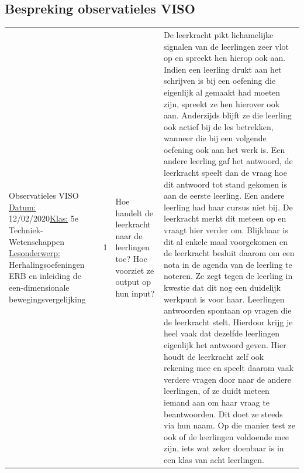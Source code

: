 \documentclass[a4paper,12pt,twoside]{article}%
\begin{document}
\begin{landscape}
	
	\subsection{Bespreking observatieles VISO}
	\begin{tabularx}{1.56\textwidth}{|Q{0.25\textwidth}|Q{0.1\textwidth}|Q{0.25\textwidth}|Q{0.85\textwidth}|}\hline
		Observatieles VISO \newline \underline{Datum:} 12/02/2020\newline \underline{Klas:} 5e Techniek-Wetenschappen \newline \underline{Lesonderwerp:}  Herhalingsoefeningen ERB en inleiding de een-dimensionale bewegingsvergelijking & 1 & Hoe handelt de leerkracht naar de leerlingen toe? Hoe voorziet ze output op hun input? & De leerkracht pikt lichamelijke signalen van de leerlingen zeer vlot op en spreekt hen hierop ook aan. Indien een leerling drukt aan het schrijven is bij een oefening die eigenlijk al gemaakt had moeten zijn, spreekt ze hen hierover ook aan. Anderzijds blijft ze die leerling ook actief bij de les betrekken, wanneer die bij een volgende oefening ook aan het werk is. Een andere leerling gaf het antwoord, de leerkracht speelt dan de vraag hoe dit antwoord tot stand gekomen is aan de eerste leerling. \newline Een andere leerling had haar cursus niet bij. De leerkracht merkt dit meteen op en vraagt hier verder om. Blijkbaar is dit al enkele maal voorgekomen en de leerkracht besluit daarom om een nota in de agenda van de leerling te noteren. Ze zegt tegen de leerling in kwestie dat dit nog een duidelijk werkpunt is voor haar. \newline Leerlingen antwoorden spontaan op vragen die de leerkracht stelt. Hierdoor krijg je heel vaak dat dezelfde leerlingen eigenlijk het antwoord geven. Hier houdt de leerkracht zelf ook rekening mee en speelt daarom vaak verdere vragen door naar de andere leerlingen, of ze duidt meteen iemand aan om haar vraag te beantwoorden. Dit doet ze steeds via hun naam. Op die manier test ze ook of de leerlingen voldoende mee zijn, iets wat zeker doenbaar is in een klas van acht leerlingen.  \\
	\end{tabularx}

\end{landscape}
\end{document}
